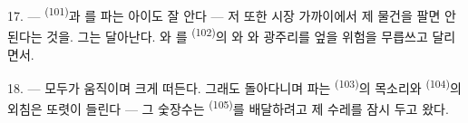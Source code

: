 \VUsaut{4.0mm}
\VUsaut{3.0mm}

17. ---  \textsuperscript{(101)}과 를 파는 아이도 잘 안다 —
저 또한 시장 가까이에서 제 물건을 팔면 안 된다는 것을. 그는 달아난다. 와
를  \textsuperscript{(102)}의 와
와  광주리를 엎을 위험을 무릅쓰고 달리면서.

18. --- 모두가 움직이며 크게 떠든다. 그래도 돌아다니며 파는 
\textsuperscript{(103)}의 목소리와  \textsuperscript{(104)}의 외침은
또렷이 들린다 — 그 숯장수는  \textsuperscript{(105)}를 배달하려고 제
수레를 잠시 두고 왔다.

\VUsaut{6.0mm}
\VUfilet{22mm}
